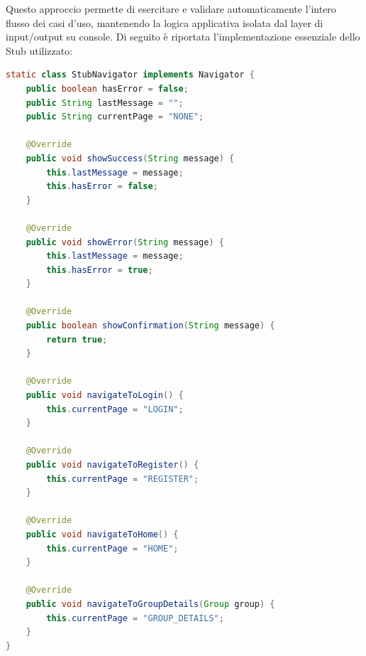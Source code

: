 Questo approccio permette di esercitare e validare automaticamente l'intero flusso 
dei casi d'uso, mantenendo la logica applicativa isolata dal layer di input/output su console.
Di seguito è riportata l'implementazione essenziale dello Stub utilizzato:

\begin{lstlisting}[language=Java, caption={Implementazione Stub per l'interfaccia Navigator}]
static class StubNavigator implements Navigator {
    public boolean hasError = false;
    public String lastMessage = "";
    public String currentPage = "NONE";

    @Override
    public void showSuccess(String message) {
        this.lastMessage = message;
        this.hasError = false;
    }

    @Override
    public void showError(String message) {
        this.lastMessage = message;
        this.hasError = true;
    }

    @Override
    public boolean showConfirmation(String message) {
        return true;
    }

    @Override
    public void navigateToLogin() {
        this.currentPage = "LOGIN";
    }

    @Override
    public void navigateToRegister() {
        this.currentPage = "REGISTER";
    }

    @Override
    public void navigateToHome() {
        this.currentPage = "HOME";
    }

    @Override
    public void navigateToGroupDetails(Group group) {
        this.currentPage = "GROUP_DETAILS";
    }
}
\end{lstlisting}